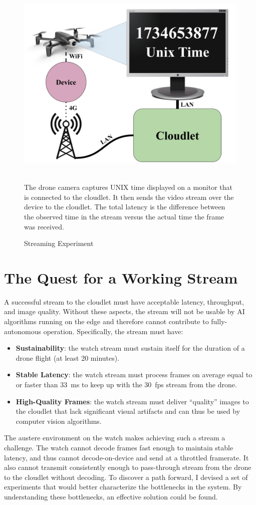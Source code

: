 \begin{figure}
    \centering
    \includegraphics[width=0.75\linewidth]{chapter3/FIGS/mtp-experiment.png}
    \begin{captext}
    \\ \small The drone camera captures UNIX time displayed on a monitor that is connected to the cloudlet. It then sends the video stream over the device to the cloudlet. The total latency is the difference between the observed time in the stream versus the actual time the frame was received.
    \end{captext}
    \caption{Streaming Experiment}
    \label{fig:streaming-experiment}
\end{figure}

\section{The Quest for a Working Stream}
\label{sec:quest-working-stream}
A successful stream to the cloudlet must have acceptable latency, throughput, and image quality. Without these aspects, the stream will not be usable by AI algorithms running on the edge and therefore cannot contribute to fully-autonomous operation. Specifically, the stream must have:
\begin{itemize}
    \item \textbf{Sustainability}: the watch stream must sustain itself for the duration of a drone flight (at least 20 minutes).
    \item \textbf{Stable Latency}: the watch stream must process frames on average equal to or faster than 33~ms to keep up with the 30~fps stream from the drone.
    \item \textbf{High-Quality Frames}: the watch stream must deliver ``quality'' images to the cloudlet that lack significant visual artifacts and can thus be used by computer vision algorithms.
\end{itemize}
The austere environment on the watch makes achieving such a stream a challenge. The watch cannot decode frames fast enough to maintain stable latency, and thus cannot decode-on-device and send at a throttled framerate. It also cannot transmit consistently enough to pass-through stream from the drone to the cloudlet without decoding. To discover a path forward, I devised a set of experiments that would better characterize the bottlenecks in the system. By understanding these bottlenecks, an effective solution could be found.

